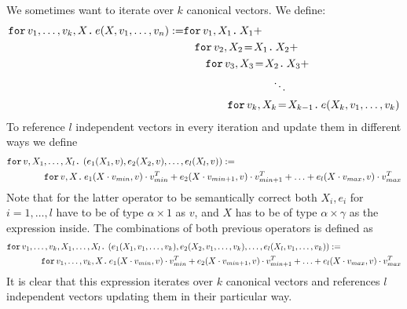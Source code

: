 We sometimes want to iterate over $k$ canonical vectors. We define:
\begin{align*}
  \ffor{v_1,\ldots, v_k}{X}{e(X,v_1,\ldots, v_n)}:= &\ffor{v_1}{X_1}{X_1 +} \\
  &\hspace{1em}\initf{X_1}{v_2}{X_2}{X_2 + } \\
  &\hspace{2em}\initf{X_2}{v_3}{X_3}{X_3 + } \\
  &\hspace{8em}\ddots \\
  &\hspace{4em}\initf{X_{k-1}}{v_k}{X_k}{ e(X_k,v_1,\ldots, v_k)}
\end{align*}
To reference $l$ independent vectors in every iteration and update them in different ways we define
\begin{align*}
&\ffor{v}{X_1,\ldots, X_l}{\left( e_1(X_1,v), e_2(X_2,v), \ldots, e_l(X_l,v) \right)} :=\\
&\hspace{4em}\ffor{v}{X}{e_1(X\cdot v_{min},v)\cdot v_{min}^T + e_2(X\cdot v_{min+1},v)\cdot v_{min+1}^T + \ldots + e_l(X\cdot v_{max},v)\cdot v_{max}^T}
\end{align*}
Note that for the latter operator to be semantically correct both $X_i,e_i$ for $ i=1,\ldots,l$ have to be of type $\alpha\times 1$ as $v$, and $X$ has to be of type $\alpha\times\gamma$ as the expression inside.
The combinations of both previous operators is defined as
\begin{align*}
&\ffor{v_1,\ldots, v_k}{X_1,\ldots, X_l}{\left( e_1(X_1,v_1,\ldots, v_k), e_2(X_2,v_1,\ldots, v_k), \ldots, e_l(X_l,v_1,\ldots, v_k) \right)} :=\\
&\hspace{4em}\ffor{v_1,\ldots, v_k}{X}{e_1(X\cdot v_{min},v)\cdot v_{min}^T + e_2(X\cdot v_{min+1},v)\cdot v_{min+1}^T + \ldots + e_l(X\cdot v_{max},v)\cdot v_{max}^T}
\end{align*}
It is clear that this expression iterates over $k$ canonical vectors and references $l$ independent vectors updating them in their particular way.